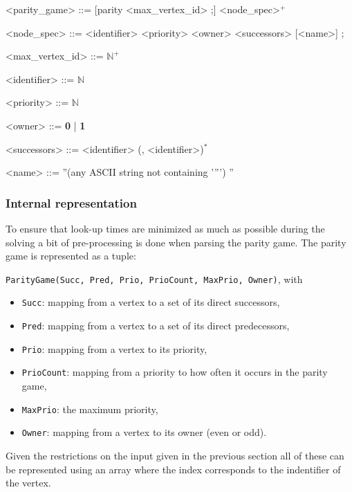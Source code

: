 \documentclass[10pt,a4paper]{article}
\begin{document}
\begin{center}
	\begin{minipage}{0.8\linewidth}
		\begin{grammar}
			<parity\_game> ::= [parity <max\_vertex\_id> ;] <node_spec>$^{+}$
			
			<node\_spec> ::= <identifier> <priority> <owner> <successors> [<name>] ;
			
      		<max\_vertex\_id> ::= $\mathbb{N}^+$
      		
      		<identifier> ::= $\mathbb{N}$
      		
      		<priority> ::= $\mathbb{N}$
      		
      		<owner> ::= \textbf{0} | \textbf{1}
      		
      		<successors> ::= <identifier> (, <identifier>)$^{*}$
      		
      		<name> ::= \textquotedblright (any ASCII string not containing \rq \textquotedblright \rq ) \textquotedblright
    \end{grammar}
  \end{minipage}
\end{center}

\subsubsection{Internal representation}
To ensure that look-up times are minimized as much as possible during the solving a bit of pre-processing is done when parsing the parity game. The parity game is represented as a tuple: 

\texttt{ParityGame(Succ, Pred, Prio, PrioCount, MaxPrio, Owner)}, with


\begin{itemize}
	\item \texttt{Succ}: mapping from a vertex to a set of its direct successors,
	\item \texttt{Pred}: mapping from a vertex to a set of its direct predecessors,
	\item \texttt{Prio}: mapping from a vertex to its priority,
	\item \texttt{PrioCount}: mapping from a priority to how often it occurs in the parity game,
	\item \texttt{MaxPrio}: the maximum priority,
	\item \texttt{Owner}: mapping from a vertex to its owner (even or odd).
\end{itemize}

Given the restrictions on the input given in the previous section all of these can be represented using an array where the index corresponds to the indentifier of the vertex.
\end{document}
